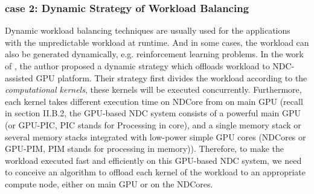\documentclass[letterpaper, 11pt, conference, margin=1in]{ieeeconf}   %
\begin{document}
\subsubsection{\bf case 2: Dynamic Strategy of Workload Balancing}
Dynamic workload balancing techniques are usually used for the applications with the unpredictable workload at runtime. And in some cases, the workload can also be generated dynamically, e.g. reinforcement learning problems. In the work of \cite{7284059}, the author proposed a dynamic strategy which offloads workload to NDC-assisted GPU platform. Their strategy first divides the workload according to the \textit{computational kernels}, these kernels will be executed concurrently. Furthermore, each kernel takes different execution time on NDCore from on main GPU (recall in section II.B.2, the GPU-based NDC system consists of a powerful main GPU (or GPU-PIC, PIC stands for Processing in core), and a single memory stack or several memory stacks integrated with low-power simple GPU cores (NDCores or GPU-PIM, PIM stands for processing in memory)). Therefore, to make the workload executed fast and efficiently on this GPU-based NDC system, we need to conceive an algorithm to offload each kernel of the workload to an appropriate compute node, either on main GPU or on the NDCores.
\end{document}
